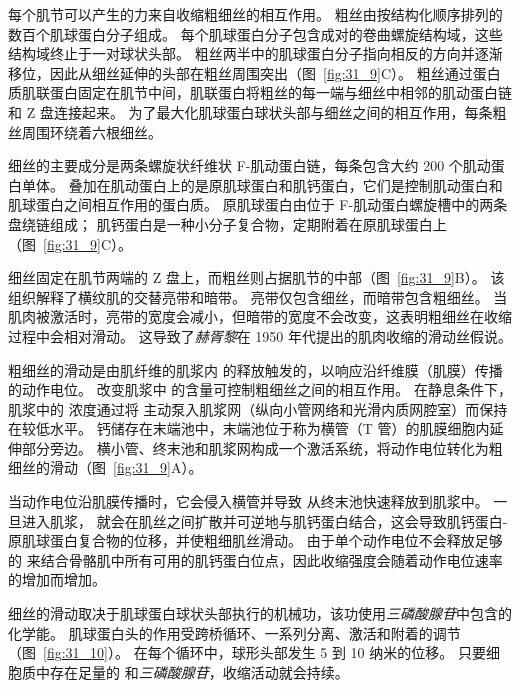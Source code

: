 每个肌节可以产生的力来自收缩粗细丝的相互作用。
粗丝由按结构化顺序排列的数百个肌球蛋白分子组成。
每个肌球蛋白分子包含成对的卷曲螺旋结构域，这些结构域终止于一对球状头部。
粗丝两半中的肌球蛋白分子指向相反的方向并逐渐移位，因此从细丝延伸的头部在粗丝周围突出（图~\ref{fig:31_9}C）。
粗丝通过蛋白质肌联蛋白固定在肌节中间，肌联蛋白将粗丝的每一端与细丝中相邻的肌动蛋白链和 Z 盘连接起来。
为了最大化肌球蛋白球状头部与细丝之间的相互作用，每条粗丝周围环绕着六根细丝。


细丝的主要成分是两条螺旋状纤维状 F-肌动蛋白链，每条包含大约 200 个肌动蛋白单体。
叠加在肌动蛋白上的是原肌球蛋白和肌钙蛋白，它们是控制肌动蛋白和肌球蛋白之间相互作用的蛋白质。
原肌球蛋白由位于 F-肌动蛋白螺旋槽中的两条盘绕链组成；
肌钙蛋白是一种小分子复合物，定期附着在原肌球蛋白上（图~\ref{fig:31_9}C）。


细丝固定在肌节两端的 Z 盘上，而粗丝则占据肌节的中部（图~\ref{fig:31_9}B）。
该组织解释了横纹肌的交替亮带和暗带。
亮带仅包含细丝，而暗带包含粗细丝。
当肌肉被激活时，亮带的宽度会减小，但暗带的宽度不会改变，这表明粗细丝在收缩过程中会相对滑动。
这导致了\textit{赫胥黎}在 1950 年代提出的肌肉收缩的滑动丝假说。


粗细丝的滑动是由肌纤维的肌浆内  的释放触发的，以响应沿纤维膜（肌膜）传播的动作电位。
改变肌浆中  的含量可控制粗细丝之间的相互作用。
在静息条件下，肌浆中的  浓度通过将  主动泵入肌浆网（纵向小管网络和光滑内质网腔室）而保持在较低水平。
钙储存在末端池中，末端池位于称为横管（T 管）的肌膜细胞内延伸部分旁边。
横小管、终末池和肌浆网构成一个激活系统，将动作电位转化为粗细丝的滑动（图~\ref{fig:31_9}A）。


当动作电位沿肌膜传播时，它会侵入横管并导致  从终末池快速释放到肌浆中。
一旦进入肌浆， 就会在肌丝之间扩散并可逆地与肌钙蛋白结合，这会导致肌钙蛋白-原肌球蛋白复合物的位移，并使粗细肌丝滑动。
由于单个动作电位不会释放足够的  来结合骨骼肌中所有可用的肌钙蛋白位点，因此收缩强度会随着动作电位速率的增加而增加。


细丝的滑动取决于肌球蛋白球状头部执行的机械功，该功使用\textit{三磷酸腺苷}中包含的化学能。
肌球蛋白头的作用受跨桥循环、一系列分离、激活和附着的调节（图~\ref{fig:31_10}）。
在每个循环中，球形头部发生 5 到 10 纳米的位移。
只要细胞质中存在足量的 和\textit{三磷酸腺苷}，收缩活动就会持续。


